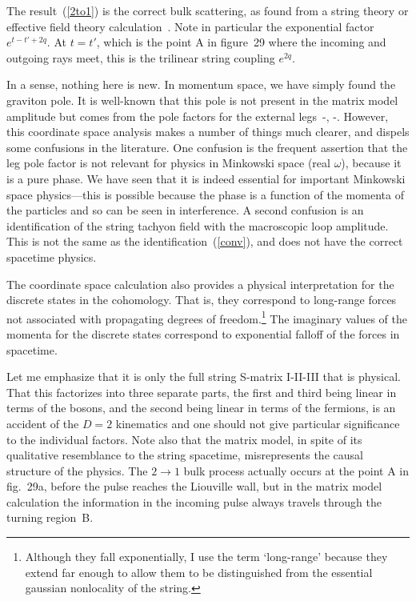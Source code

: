 The result~(\ref{2to1}) is the correct bulk scattering, as found
from a string theory or effective field theory calculation~\cite{NP}.
Note in particular the exponential factor $e^{t - t' + 2q}$.  At
$t=t'$, which is the point A in figure~29 where the incoming and
outgoing rays meet, this is the trilinear string coupling $e^{2q}$.

In a sense, nothing here is new.  In momentum space, we have
simply found the graviton pole.  It is well-known that this pole
is not present in the matrix model amplitude but comes from the
pole factors for the external legs~\cite{dFK}-\cite{GKs1c1},
\cite{STlp}-\cite{Llp}.
However, this coordinate
space analysis makes a number of things much clearer, and dispels
some confusions in the literature.  One confusion is the frequent
assertion that the leg pole factor is not relevant for physics
in Minkowski space (real $\omega$),
because it is a pure phase.  We have seen that it is indeed
essential for important Minkowski space physics---this is possible
because the phase is a function of the momenta of the particles and
so can be seen in interference.  A second confusion is an
identification of the string tachyon field with the macroscopic
loop amplitude.  This is not the same as the
identification~(\ref{conv}), and does not have the correct
spacetime physics.

The coordinate space calculation also provides a physical
interpretation for the discrete states in the cohomology.  That is,
they correspond to long-range forces not associated with propagating
degrees of freedom.\footnote{Although they fall exponentially, I
use the term `long-range' because they extend far enough to
allow them to be distinguished from the essential gaussian
nonlocality of the string.}
The imaginary values of the momenta
for the discrete states correspond to exponential falloff of the
forces in spacetime.  

Let me emphasize that it is
only the full string S-matrix I-II-III that is physical.
That this factorizes into three separate parts, the first and third
being linear in terms of the bosons, and the second being linear
in terms of the fermions, is an accident of the $D=2$ kinematics
and one should not give particular significance to the individual
factors.  Note also that the matrix model, in spite of its
qualitative resemblance to the string spacetime,
misrepresents the causal structure of the physics.  The $2 \to 1$
bulk process actually occurs at the point A in fig.~29a, before
the pulse reaches the Liouville wall, but in the matrix model
calculation the information in the incoming pulse always travels
through the turning region~B.

